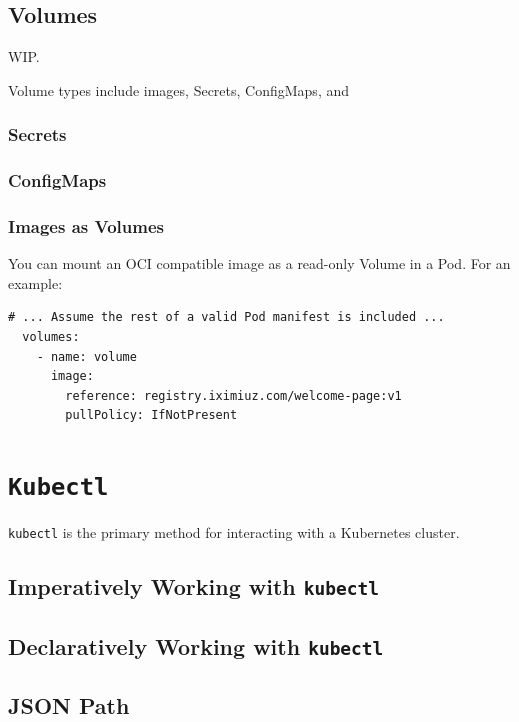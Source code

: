 \documentclass[11pt, a4paper]{article}
\begin{document}
\subsection{Volumes}

WIP.

Volume types include images, Secrets, ConfigMaps, and

\subsubsection{Secrets}

\subsubsection{ConfigMaps}

\subsubsection{Images as Volumes}

You can mount an OCI compatible image as a read-only Volume in a Pod. For an example:

\begin{lstlisting}
# ... Assume the rest of a valid Pod manifest is included ...
  volumes:
    - name: volume
      image:
        reference: registry.iximiuz.com/welcome-page:v1
        pullPolicy: IfNotPresent
\end{lstlisting}

\section{\texttt{Kubectl}}

\texttt{kubectl} is the primary method for interacting with a Kubernetes cluster.

\subsection{Imperatively Working with \texttt{kubectl}}

\subsection{Declaratively Working with \texttt{kubectl}}

\subsection{JSON Path}
\end{document}
